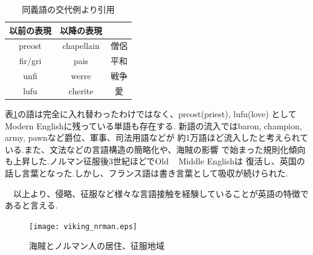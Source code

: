 \begin{table}[htb]
  \begin{center}
    \caption{同義語の交代例\cite{ziten}より引用}
    \begin{tabular}{ccc} 
      以前の表現 & 以降の表現 &  \\ \hline
      preost & chapellain & 僧侶  \\ 
      fir\textipa{\dh}/gri\textipa{\dh} & pais & 平和\\
      unfi\textipa{\dh} & werre & 戦争 \\
      lufu & cherite & 愛
      
    \end{tabular}
    \label{tab:change}
  \end{center}
\end{table}

表\ref{tab:change}の語は完全に入れ替わったわけではなく、preost(priest), lufu(love)
としてModern Englishに残っている単語も存在する.
新語の流入ではbaron, champion, army, pawnなど爵位、軍事、司法用語などが
約1万語ほど流入したと考えられている.また、文法などの言語構造の簡略化や、海賊の影響
で始まった規則化傾向も上昇した.ノルマン征服後3世紀ほどでOld ~ Middle Englishは
復活し、英国の話し言葉となった.しかし、フランス語は書き言葉として吸収が続けられた.

　以上より、侵略、征服など様々な言語接触を経験していることが英語の特徴であると言える.


\begin{figure}[htbp]
 \centering
 \texttt{[image: viking\_nrman.eps]}
 \caption{海賊とノルマン人の居住、征服地域\label{fig:viking_nrman}}
\end{figure}
